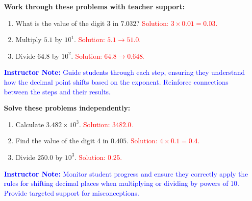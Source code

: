 \documentclass[12pt]{article}
\begin{document}
\vspace{1em}

\begin{tcolorbox}[colframe=black!60, colback=white,
coltitle=black, colbacktitle=black!15, fonttitle=\bfseries\Large,
title=Guided Practice, halign title=center, left=10pt, right=10pt, top=10pt, bottom=15pt]
\textbf{Work through these problems with teacher support:}
\begin{enumerate}[itemsep=3em]
    \item What is the value of the digit 3 in \(7.032\)? \textcolor{red}{Solution: \(3 \times 0.01 = 0.03\).}
    \item Multiply \(5.1\) by \(10^1\). \textcolor{red}{Solution: \(5.1 \to 51.0\).}
    \item Divide \(64.8\) by \(10^2\). \textcolor{red}{Solution: \(64.8 \to 0.648\).}
\end{enumerate}

\textcolor{blue}{\textbf{Instructor Note:} Guide students through each step, ensuring they understand how the decimal point shifts based on the exponent. Reinforce connections between the steps and their results.}
\end{tcolorbox}

\vspace{1em}

\begin{tcolorbox}[colframe=black!60, colback=white,
coltitle=black, colbacktitle=black!15, fonttitle=\bfseries\Large,
title=Independent Practice, halign title=center, left=10pt, right=10pt, top=10pt, bottom=15pt]
\textbf{Solve these problems independently:}
\begin{enumerate}[itemsep=3em]
    \item Calculate \(3.482 \times 10^3\). \textcolor{red}{Solution: \(3482.0\).}
    \item Find the value of the digit 4 in \(0.405\). \textcolor{red}{Solution: \(4 \times 0.1 = 0.4\).}
    \item Divide \(250.0\) by \(10^3\). \textcolor{red}{Solution: \(0.25\).}
\end{enumerate}

\textcolor{blue}{\textbf{Instructor Note:} Monitor student progress and ensure they correctly apply the rules for shifting decimal places when multiplying or dividing by powers of 10. Provide targeted support for misconceptions.}
\end{tcolorbox}

\vspace{1em}
\end{document}
